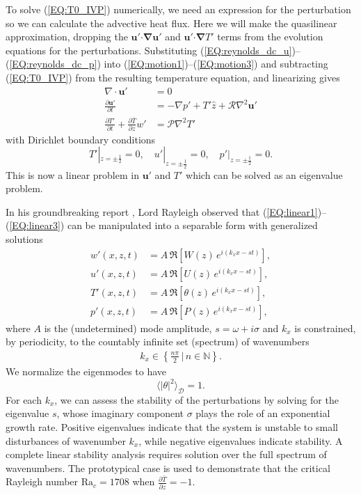 \documentclass[reprint,amsmath,amssymb,aps]{revtex4-1}
\newcommand\Ra{\mathrm{Ra}}
\renewcommand{\vec}[1]{\boldsymbol{#1}}
\newcommand{\eq}[1]{(\ref{#1})}
\newcommand{\eqss}[2]{(\ref{#1})--(\ref{#2})}
\begin{document}
To solve \eq{EQ:T0_IVP} numerically, we need an expression for the perturbation so we can calculate the advective heat flux.
Here we will make the quasilinear approximation, dropping the $\vec{u}'\vec{\cdot}\vec{\nabla}\vec{u}'$ and $\vec{u}'\vec{\cdot}\vec{\nabla}T'$ terms from the evolution equations for the perturbations.
Substituting \eqss{EQ:reynolds_dc_u}{EQ:reynolds_dc_p} into \eqss{EQ:motion1}{EQ:motion3} and subtracting \eq{EQ:T0_IVP} from the resulting temperature equation, and linearizing gives
\begin{align}
    \nabla \cdot \vec{u'} &= 0 \label{EQ:linear1}\\
    \frac{\partial\vec{u'}}{\partial t} &= - \nabla p' + T'\hat{z} + \mathcal{R} \nabla^2 \vec{u'} \label{EQ:linear2}\\
    \frac{\partial T'}{\partial t} + \frac{\partial \bar{T}}{\partial z} w' &= \mathcal{P} \nabla^2 T' \label{EQ:linear3}
\end{align}
with Dirichlet boundary conditions 
\begin{equation}
    T'|_{z = \pm \frac{1}{2}} = 0, \quad u'|_{z = \pm \frac{1}{2}} = 0, \quad p'|_{z = \pm \frac{1}{2}} = 0.
\end{equation}
This is now a linear problem in $\vec{u}'$ and $T'$ which can be solved as an eigenvalue problem.

In his groundbreaking report \cite{Rayleigh_1916}, Lord Rayleigh observed that \eqss{EQ:linear1}{EQ:linear3} can be manipulated into a separable form with generalized solutions
\begin{align}
    w'(x, z, t) &= A\, \Re\left[W(z) \, e^{i(k_xx-st)}\right], \label{EQ:normal_modes1}\\ 
    u'(x, z, t) &= A\, \Re\left[U(z) \, e^{i(k_xx-st)}\right], \label{EQ:normal_modes2}\\ 
    T'(x, z, t) &= A\, \Re\left[\theta(z) \, e^{i(k_xx-st)}\right], \label{EQ:normal_modes3}\\ 
    p'(x, z, t) &= A\, \Re\left[P(z) \, e^{i(k_xx-st)}\right], \label{EQ:normal_modes4}
\end{align}
where $A$ is the (undetermined) mode amplitude, $s = \omega + i\sigma$ and $k_x$ is constrained, by periodicity, to the countably infinite set (spectrum) of wavenumbers
\begin{align}
    k_x \in \left\{\frac{n\pi}{2} \, \big| \, n \in \mathbb{N}\right\}.
\end{align}
We normalize the eigenmodes to have
\begin{equation}
  \langle |\theta|^2 \rangle_{\mathcal{D}} = 1.
\end{equation}
For each $k_x$, we can assess the stability of the perturbations by solving for the eigenvalue $s$, whose imaginary component $\sigma$ plays the role of an exponential growth rate. 
Positive eigenvalues indicate that the system is unstable to small disturbances of wavenumber $k_x$, while negative eigenvalues indicate stability. 
A complete linear stability analysis requires solution over the full spectrum of wavenumbers. 
The prototypical case is used to demonstrate that the critical Rayleigh number $\Ra_c = 1708$ when $\frac{\partial \bar{T}}{\partial z} = -1$.
\end{document}
